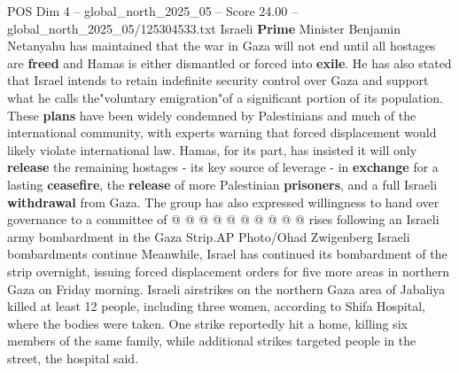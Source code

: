 \begin{textsample}{POS Dim 4 – global\_north\_2025\_05 – Score 24.00 – global\_north\_2025\_05/125304533.txt}
Israeli \textbf{Prime} Minister Benjamin Netanyahu has maintained that the war in Gaza will not end until all hostages are \textbf{freed} and Hamas is either dismantled or forced into \textbf{exile}.
He has also stated that Israel intends to retain indefinite security control over Gaza and support what he calls the"voluntary emigration"of a significant portion of its population.
These \textbf{plans} have been widely condemned by Palestinians and much of the international community, with experts warning that forced displacement would likely violate international law.
Hamas, for its part, has insisted it will only \textbf{release} the remaining hostages - its key source of leverage - in \textbf{exchange} for a lasting \textbf{ceasefire}, the \textbf{release} of more Palestinian \textbf{prisoners}, and a full Israeli \textbf{withdrawal} from Gaza.
The group has also expressed willingness to hand over governance to a committee of @ @ @ @ @ @ @ @ @ @ rises following an Israeli army bombardment in the Gaza Strip.AP Photo/Ohad Zwigenberg Israeli bombardments continue Meanwhile, Israel has continued its bombardment of the strip overnight, issuing forced displacement orders for five more areas in northern Gaza on Friday morning.
Israeli airstrikes on the northern Gaza area of Jabaliya killed at least 12 people, including three women, according to Shifa Hospital, where the bodies were taken.
One strike reportedly hit a home, killing six members of the same family, while additional strikes targeted people in the street, the hospital said.

\end{textsample}
